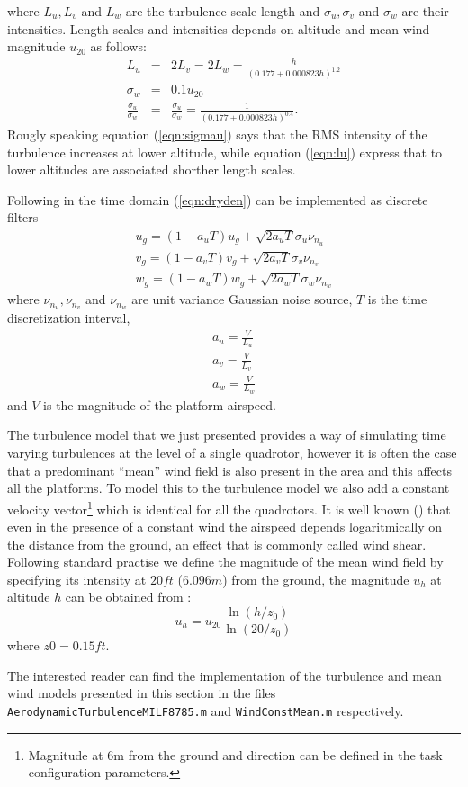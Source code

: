 \documentclass[a4paper,11pt]{report}
\begin{document}
where $L_u,L_v$ and $L_w$ are the turbulence scale length and $\sigma_u,\sigma_v$ and $\sigma_w$ are their intensities.
Length scales and intensities depends on altitude and mean wind magnitude $u_{20}$ as follows:
\begin{eqnarray}
L_u &=& 2L_v = 2L_w = \frac{h}{(0.177+0.000823 h)^{1.2}}\label{eqn:lu}\\
\sigma_w&=&0.1u_{20} \\
\frac{\sigma_u}{\sigma_w}&=&\frac{\sigma_u}{\sigma_w}=\frac{1}{(0.177+0.000823 h)^{0.4}}\label{eqn:sigmau}.
\end{eqnarray}
Rougly speaking equation (\ref{eqn:sigmau}) says that the RMS intensity of the turbulence increases at lower altitude, while equation (\ref{eqn:lu}) express that to lower altitudes are associated shorther length scales.

Following \cite{milf8785c} in the time domain (\ref{eqn:dryden}) can be implemented as discrete filters  
\begin{eqnarray}
u_g=(1-a_uT)u_g+\sqrt{2a_uT}\sigma_u\nu_{n_u}\\
v_g=(1-a_vT)v_g+\sqrt{2a_vT}\sigma_v\nu_{n_v}\\
w_g=(1-a_wT)w_g+\sqrt{2a_wT}\sigma_w\nu_{n_w}
\end{eqnarray}
where $\nu_{n_u},\nu_{n_v}$ and $\nu_{n_w}$ are unit variance Gaussian noise source, $T$ is the time discretization interval,  
\begin{eqnarray}
a_u=\frac{V}{L_u}\\ 
a_v=\frac{V}{L_v}\\ 
a_w=\frac{V}{L_w}
\end{eqnarray}
and $V$ is the magnitude of the platform airspeed.

The turbulence model that we just presented provides a way of simulating time varying turbulences at the level of a single quadrotor, however it is often the case that a predominant ``mean'' wind field is also present in the area and this affects all the platforms. 
To model this to the turbulence model we also add a constant velocity vector\footnote{Magnitude at 6m from the ground and direction can be defined in the task configuration parameters.} which is identical for all the quadrotors. It is well known (\cite{milf8785c}) that even in the presence of a constant wind the airspeed depends logaritmically on the distance from the ground, an effect that is commonly called wind shear.
Following standard practise we define the magnitude of the mean wind field by specifying its intensity at $20ft$ ($6.096m$) from the ground, the magnitude $u_h$ at altitude $h$ can be obtained from :
\begin{equation}
u_h = u_{20} \frac{\ln(h/z_0)}{\ln(20/z_0)}
\end{equation}
where $z0=0.15ft$.

The interested reader can find the implementation of the turbulence and mean wind models presented in this section in the files \texttt{AerodynamicTurbulenceMILF8785.m} and \texttt{WindConstMean.m} respectively.  



\end{document}

